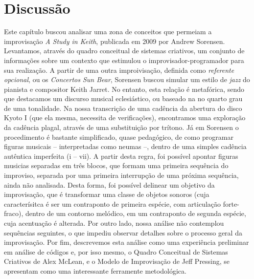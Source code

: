 \section{Discussão}

Este capítulo buscou analisar uma zona de conceitos que permeiam a improvisação \emph{A Study in Keith}, publicada em 2009 por Andrew Sorensen. Levantamos, através do quadro conceitual de sistemas criativos, um conjunto de informações sobre um contexto que estimulou o improvisador-programador para sua realização. A partir de uma outra improivisação,  definida como \emph{referente opcional}, ou os \emph{Concertos Sun Bear}, Sorensen buscou simular um estilo de \emph{jazz} do pianista e compositor Keith Jarret. No entanto, esta relação é metafórica, sendo que destacamos um discurso musical eclesiástico, ou baseado na no quarto grau de uma tonalidade. Na nossa transcrição de uma cadência da abertura do disco Kyoto I (que ela mesma, necessita de verificações), encontramos uma exploração da cadência plagal, através de uma substituição por trítono. Já em Sorensen o procedimento é bastante simplificado, quase pedagógico, de como programar figuras musicais -- interpretadas como neumas --, dentro de uma simples cadência autêntica imperfeita (i -- vii). A partir desta regra, foi possível apontar figuras musicias separadas em três blocos, que formam uma primeira sequência do improviso, separada por uma primeira interrupção de uma próxima sequência, ainda não analisada. Desta forma, foi possível delinear um objetivo da improvisação, que é transformar uma classe de objetos sonoros (cuja caracterísitca é ser um contraponto de primeira espécie, com articulação forte-fraco), dentro de um contorno melódico, em um contraponto de segunda espécie, cuja acentuação é alterada. Por outro lado, nossa análise não contemplou sequências seguintes, o que impediu observar detalhes sobre o processo geral da improvisação. Por fim, descrevemos esta análise como uma experiência preliminar em análise de códigos e, por isso mesmo, o Quadro Conceitual de Sistemas Criativos de Alex McLean, e o Modelo de Improvisação de Jeff Pressing, se apresentam como uma interessante ferramente metodológica. 
